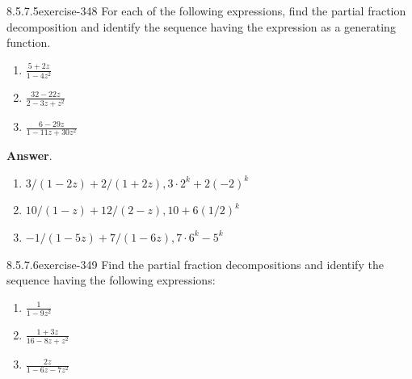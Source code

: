 \documentclass[twoside,10pt,]{book}
\numberwithin{equation}{section}
\begin{document}
\begin{divisionsolution}{8.5.7.5}{}{exercise-348}%
\hypertarget{p-2981}{}%
For each of the following expressions, find the partial fraction decomposition and identify the sequence having the expression as a generating function.%
\par
\hypertarget{p-2982}{}%
\leavevmode%
\begin{enumerate}[label=(\alph*)]
\item\hypertarget{li-1458}{}\hypertarget{p-2983}{}%
\(\frac{5+2z}{1-4z^2}\)%
\item\hypertarget{li-1459}{}\hypertarget{p-2984}{}%
\(\frac{32-22z}{2-3z+z^2}\)%
\item\hypertarget{li-1460}{}\hypertarget{p-2985}{}%
\(\frac{6-29z}{1-11z+ 30z^2}\)%
\end{enumerate}
%
\par\smallskip%
\noindent\textbf{Answer}.\quad%
\hypertarget{p-2986}{}%
\leavevmode%
\begin{enumerate}[label=(\alph*)]
\item\hypertarget{li-1461}{}\hypertarget{p-2987}{}%
\(3/(1-2z)+2/(1+2z), 3\cdot 2^k+2(-2)^k\)%
\item\hypertarget{li-1462}{}\hypertarget{p-2988}{}%
\(10/(1-z)+12/(2-z), 10+6(1/2)^k\)%
\item\hypertarget{li-1463}{}\hypertarget{p-2989}{}%
\(-1/(1-5z)+7/(1-6z), 7\cdot 6^k-5^k\)%
\end{enumerate}
%
\end{divisionsolution}%
\begin{divisionsolution}{8.5.7.6}{}{exercise-349}%
\hypertarget{p-2990}{}%
Find the partial fraction decompositions and identify the sequence having the following expressions:%
\par
\hypertarget{p-2991}{}%
\leavevmode%
\begin{enumerate}[label=(\alph*)]
\item\hypertarget{li-1464}{}\hypertarget{p-2992}{}%
\(\frac{1}{1-9z^2}\)%
\item\hypertarget{li-1465}{}\hypertarget{p-2993}{}%
\(\frac{1+3z}{16-8z+z^2}\)%
\item\hypertarget{li-1466}{}\hypertarget{p-2994}{}%
\(\frac{2z}{1-6z-7z^2}\)%
\end{enumerate}
%
\end{divisionsolution}%
\end{document}
